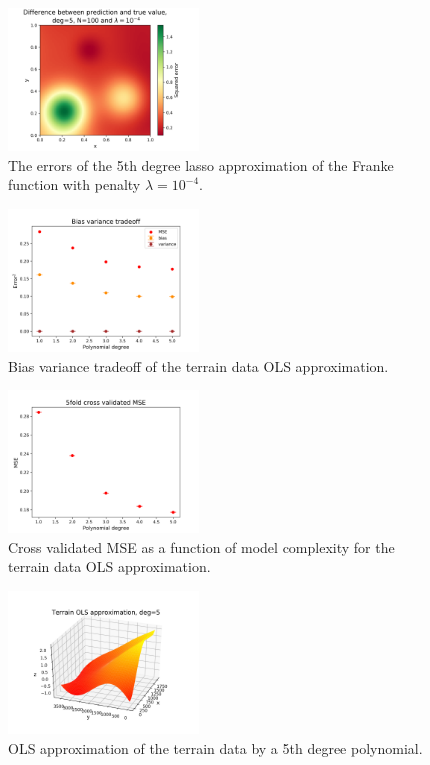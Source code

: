 \documentclass[notitlepage, reprint, nofootinbib]{revtex4-1}
\begin{document}
\clearpage

\begin{figure}
 	\centering
  	\includegraphics[width=0.45\textwidth]{../Figures/franke_lasso_error_deg5_N100.png}
  	\caption{The errors of the 5th degree lasso approximation of the Franke function with penalty $\lambda=10^{-4}$.}
	\label{fig13}
\end{figure}


\begin{figure}
	\centering
	\includegraphics[width=0.45\textwidth]{../Figures/b-v_tradeoff_terrain_OLS.png}
	\caption{Bias variance tradeoff of the terrain data OLS approximation.}
	\label{fig14}
\end{figure}

\begin{figure}
	\centering
	\includegraphics[width=0.45\textwidth]{../Figures/kfold_mse_terrain_OLS.png}
	\caption{Cross validated MSE as a function of model complexity for the terrain data OLS approximation.}
	\label{fig15}
\end{figure}

\begin{figure}
 	\centering
	\includegraphics[width=0.45\textwidth]{../Figures/terrain_OLS_deg5_adjusted.png}
  	\caption{OLS approximation of the terrain data by a 5th degree polynomial.}
	\label{fig16}
\end{figure}
\end{document}
